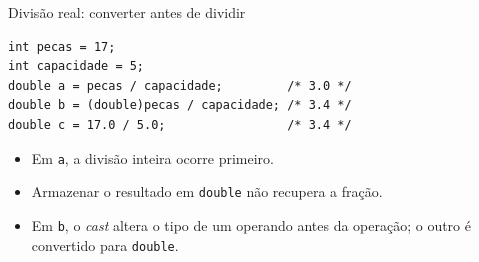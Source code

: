 \begin{frame}[fragile]{Divisão real: converter antes de dividir}
\begin{lstlisting}
int pecas = 17;
int capacidade = 5;
double a = pecas / capacidade;         /* 3.0 */
double b = (double)pecas / capacidade; /* 3.4 */
double c = 17.0 / 5.0;                 /* 3.4 */
\end{lstlisting}
\begin{itemize}
\item Em \texttt{a}, a divisão inteira ocorre primeiro.
\item Armazenar o resultado em \texttt{double} não recupera a fração.
\item Em \texttt{b}, o \textit{cast} altera o tipo de um operando antes da operação; o outro é convertido para \texttt{double}.
\end{itemize}
\end{frame}
